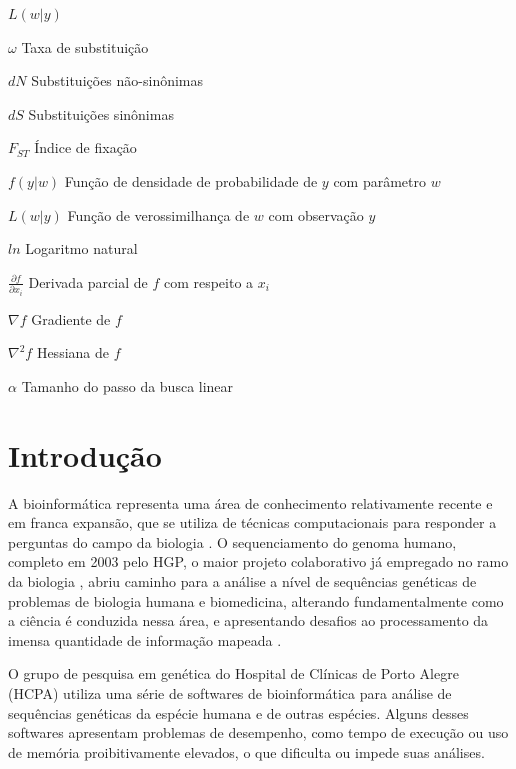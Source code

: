 \documentclass[cic,tc]{iiufrgs}
\begin{document}
\begin{listofsymbols}{$L(w|y)$}
    \item[$\omega$] Taxa de substituição
    \item[$dN$] Substituições não-sinônimas
    \item[$dS$] Substituições sinônimas
    \item[$F_{ST}$] Índice de fixação
    \item[$f(y|w)$] Função de densidade de probabilidade de $y$ com parâmetro $w$
    \item[$L(w|y)$] Função de verossimilhança de $w$ com observação $y$
    \item[$ln$] Logaritmo natural
    \item[$\frac{\partial f}{\partial x_i}$] Derivada parcial de $f$ com respeito a $x_i$
    \item[$\nabla f$] Gradiente de $f$
    \item[$\nabla^2 f$] Hessiana de $f$
    \item[$\alpha$] Tamanho do passo da busca linear
\end{listofsymbols}

\tableofcontents

%
%
%
%

\chapter{Introdução}
\label{chap:intro}

%
%
A bioinformática representa uma área de conhecimento relativamente recente e em
franca expansão, que se utiliza de técnicas computacionais para responder a
perguntas do campo da biologia \cite{baxevanis2020bioinformatics}. O
sequenciamento do genoma humano, completo em 2003 pelo HGP, o maior projeto
colaborativo já empregado no ramo da biologia \cite{tripp2011economic}, abriu
caminho para a análise a nível de sequências genéticas de problemas de biologia
humana e biomedicina, alterando fundamentalmente como a ciência é conduzida
nessa área, e apresentando desafios ao processamento da imensa quantidade de
informação mapeada \cite{baxevanis2020bioinformatics}.

%
%
O grupo de pesquisa em genética do Hospital de Clínicas de Porto Alegre (HCPA)
utiliza uma série de softwares de bioinformática para análise de sequências
genéticas da espécie humana e de outras espécies. Alguns desses softwares
apresentam problemas de desempenho, como tempo de execução ou uso de memória
proibitivamente elevados, o que dificulta ou impede suas análises.
\end{document}

